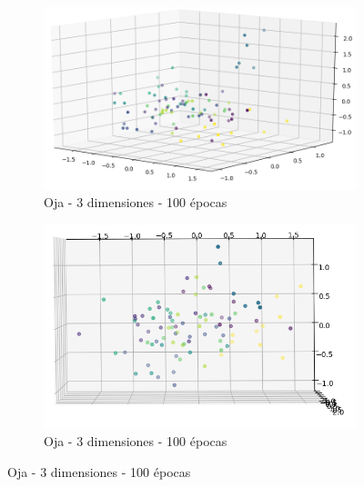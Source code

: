 \begin{figure}[!htbp]
\centering
\begin{subfigure}{.5\textwidth}
  \centering
  \includegraphics[width=1\linewidth, scale=1]{../img/ej1/oja/oja_3salida_100ep_validation.png}
  \caption{Oja - 3 dimensiones - 100 épocas}
  \label{fig:sub1}
\end{subfigure}%
\begin{subfigure}{.5\textwidth}
  \centering
  \includegraphics[width=1\linewidth, scale=1]{../img/ej1/oja/oja_3salida_100ep_validation_3.png}
  \caption{Oja - 3 dimensiones - 100 épocas}
  \label{fig:sub2}
\end{subfigure}
\end{figure}

